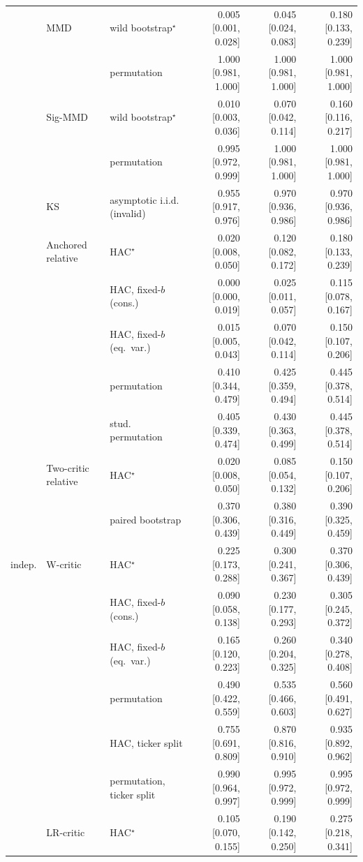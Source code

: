 \begin{tabular}{lllrrr}
 & MMD & wild bootstrap$^{\star}$ & 0.005 [0.001, 0.028] & 0.045 [0.024, 0.083] & 0.180 [0.133, 0.239] \\
 &  & permutation & 1.000 [0.981, 1.000] & 1.000 [0.981, 1.000] & 1.000 [0.981, 1.000] \\
 & Sig-MMD & wild bootstrap$^{\star}$ & 0.010 [0.003, 0.036] & 0.070 [0.042, 0.114] & 0.160 [0.116, 0.217] \\
 &  & permutation & 0.995 [0.972, 0.999] & 1.000 [0.981, 1.000] & 1.000 [0.981, 1.000] \\
 & KS & asymptotic i.i.d. (invalid) & 0.955 [0.917, 0.976] & 0.970 [0.936, 0.986] & 0.970 [0.936, 0.986] \\
 & Anchored relative & HAC$^{\star}$ & 0.020 [0.008, 0.050] & 0.120 [0.082, 0.172] & 0.180 [0.133, 0.239] \\
 &  & HAC, fixed-$b$ (cons.) & 0.000 [0.000, 0.019] & 0.025 [0.011, 0.057] & 0.115 [0.078, 0.167] \\
 &  & HAC, fixed-$b$ (eq.\ var.) & 0.015 [0.005, 0.043] & 0.070 [0.042, 0.114] & 0.150 [0.107, 0.206] \\
 &  & permutation & 0.410 [0.344, 0.479] & 0.425 [0.359, 0.494] & 0.445 [0.378, 0.514] \\
 &  & stud. permutation & 0.405 [0.339, 0.474] & 0.430 [0.363, 0.499] & 0.445 [0.378, 0.514] \\
 & Two-critic relative & HAC$^{\star}$ & 0.020 [0.008, 0.050] & 0.085 [0.054, 0.132] & 0.150 [0.107, 0.206] \\
 &  & paired bootstrap & 0.370 [0.306, 0.439] & 0.380 [0.316, 0.449] & 0.390 [0.325, 0.459] \\
indep. & W-critic & HAC$^{\star}$ & 0.225 [0.173, 0.288] & 0.300 [0.241, 0.367] & 0.370 [0.306, 0.439] \\
 &  & HAC, fixed-$b$ (cons.) & 0.090 [0.058, 0.138] & 0.230 [0.177, 0.293] & 0.305 [0.245, 0.372] \\
 &  & HAC, fixed-$b$ (eq.\ var.) & 0.165 [0.120, 0.223] & 0.260 [0.204, 0.325] & 0.340 [0.278, 0.408] \\
 &  & permutation & 0.490 [0.422, 0.559] & 0.535 [0.466, 0.603] & 0.560 [0.491, 0.627] \\
 &  & HAC, ticker split & 0.755 [0.691, 0.809] & 0.870 [0.816, 0.910] & 0.935 [0.892, 0.962] \\
 &  & permutation, ticker split & 0.990 [0.964, 0.997] & 0.995 [0.972, 0.999] & 0.995 [0.972, 0.999] \\
 & LR-critic & HAC$^{\star}$ & 0.105 [0.070, 0.155] & 0.190 [0.142, 0.250] & 0.275 [0.218, 0.341] \\

\end{tabular}

